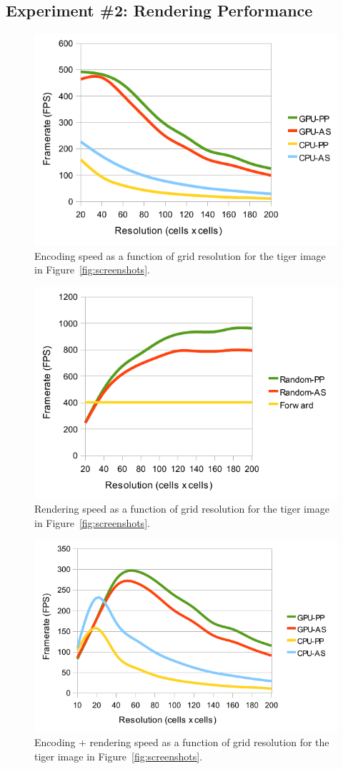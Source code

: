 \documentclass[11pt,a4paper,twoside]{article}
\begin{document}
\subsection {Experiment \#2: Rendering Performance}

\begin {figure} [p]
	\centering
	\includegraphics[width=0.6\columnwidth] {figures/graph_grid_encode}
	\caption {Encoding speed as a function of grid resolution for the tiger image in Figure~\ref{fig:screenshots}.}
	\label {fig:graph_grid_encode}
\end {figure}

\begin {figure} [p]
	\centering
	\includegraphics[width=0.6\columnwidth] {figures/graph_grid_render}
	\caption {Rendering speed as a function of grid resolution for the tiger image in Figure~\ref{fig:screenshots}.}
	\label {fig:graph_grid_render}
\end {figure}

\begin {figure} [p]
	\centering
	\includegraphics[width=0.6\columnwidth] {figures/graph_grid_encode_render}
	\caption {Encoding + rendering speed as a function of grid resolution for the tiger image in Figure~\ref{fig:screenshots}.}
	\label {fig:graph_grid_encode_render}
\end {figure}
\end{document}

